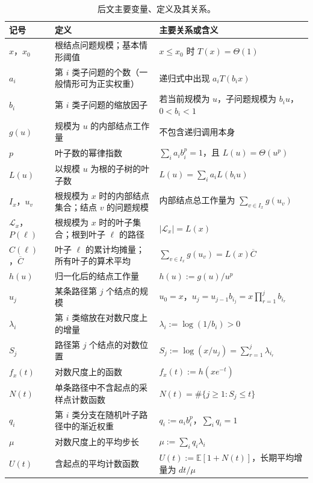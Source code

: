 \documentclass[11pt,a4paper]{article}
\begin{document}
\begin{table}[!htbp]
\centering
\small
\caption{后文主要变量、定义及其关系。}
\label{tab:notation}
\begin{tabularx}{\textwidth}{>{\raggedright\arraybackslash}p{} >{\raggedright\arraybackslash}p{} X}
\toprule
记号 & 定义 & 主要关系或含义\\
\midrule
$x$，$x_0$ & 根结点问题规模；基本情形阈值 & $x\le x_0$ 时 $T(x)=\Theta(1)$\\
$a_i$ & 第 $i$ 类子问题的个数（一般情形可为正实权重） & 递归式中出现 $a_iT(b_i x)$\\
$b_i$ & 第 $i$ 类子问题的缩放因子 & 若当前规模为 $u$，子问题规模为 $b_i u$，$0<b_i<1$\\
$g(u)$ & 规模为 $u$ 的内部结点工作量 & 不包含递归调用本身\\
$p$ & 叶子数的幂律指数 & $\sum_i a_i b_i^p=1$，且 $L(u)=\Theta(u^p)$\\
$L(u)$ & 以规模 $u$ 为根的子树的叶子数 & $L(u)=\sum_i a_iL(b_i u)$\\
$I_x$，$u_v$ & 根规模为 $x$ 时的内部结点集合；结点 $v$ 的问题规模 & 内部结点总工作量为 $\sum_{v\in I_x}g(u_v)$\\
$\mathcal L_x$，$P(\ell)$ & 根规模为 $x$ 时的叶子集合；根到叶子 $\ell$ 的路径 & $|\mathcal L_x|=L(x)$\\
$C(\ell)$，$\overline C$ & 叶子 $\ell$ 的累计均摊量；所有叶子的算术平均 & $\sum_{v\in I_x}g(u_v)=L(x)\overline C$\\
$h(u)$ & 归一化后的结点工作量 & $h(u):=g(u)/u^p$\\
$u_j$ & 某条路径第 $j$ 个结点的规模 & $u_0=x$，$u_j=u_{j-1}b_{i_j}=x\prod_{r=1}^j b_{i_r}$\\
$\lambda_i$ & 第 $i$ 类缩放在对数尺度上的增量 & $\lambda_i:=\log(1/b_i)>0$\\
$S_j$ & 路径第 $j$ 个结点的对数位置 & $S_j:=\log(x/u_j)=\sum_{r=1}^j\lambda_{i_r}$\\
$f_x(t)$ & 对数尺度上的函数 & $f_x(t):=h(xe^{-t})$\\
$N(t)$ & 单条路径中不含起点的采样点计数函数 & $N(t)=\#\{j\ge1:S_j\le t\}$\\
$q_i$ & 第 $i$ 类分支在随机叶子路径中的渐近权重 & $q_i:=a_i b_i^p$，$\sum_iq_i=1$\\
$\mu$ & 对数尺度上的平均步长 & $\mu:=\sum_i q_i\lambda_i$\\
$U(t)$ & 含起点的平均计数函数 & $U(t):=\mathbb E[1+N(t)]$，长期平均增量为 $dt/\mu$\\
\bottomrule
\end{tabularx}
\end{table}
\end{document}
